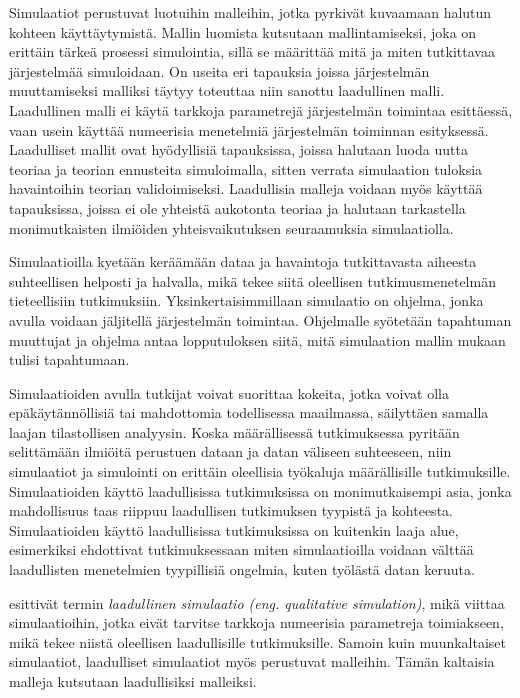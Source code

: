 \documentclass[utf8]{gradu3}
\begin{document}
Simulaatiot perustuvat luotuihin malleihin, 
jotka pyrkivät kuvaamaan halutun kohteen käyttäytymistä. 
Mallin luomista kutsutaan mallintamiseksi, joka on erittäin tärkeä prosessi simulointia,
sillä se määrittää mitä ja miten tutkittavaa järjestelmää simuloidaan. On useita eri tapauksia joissa järjestelmän muuttamiseksi malliksi täytyy toteuttaa niin sanottu laadullinen malli. Laadullinen malli ei käytä tarkkoja parametrejä järjestelmän toimintaa
esittäessä, vaan usein käyttää numeerisia menetelmiä järjestelmän toiminnan esityksessä.
Laadulliset mallit ovat hyödyllisiä tapauksissa, joissa halutaan luoda uutta teoriaa ja teorian ennusteita simuloimalla, sitten verrata simulaation tuloksia havaintoihin teorian validoimiseksi. 
Laadullisia malleja voidaan myös käyttää tapauksissa, joissa ei ole yhteistä aukotonta teoriaa ja halutaan tarkastella monimutkaisten ilmiöiden yhteisvaikutuksen seuraamuksia simulaatiolla.

Simulaatioilla kyetään keräämään dataa ja havaintoja tutkittavasta aiheesta suhteellisen helposti ja halvalla, mikä tekee siitä oleellisen tutkimusmenetelmän tieteellisiin tutkimuksiin. Yksinkertaisimmillaan simulaatio on ohjelma, jonka avulla voidaan jäljitellä järjestelmän toimintaa. Ohjelmalle syötetään tapahtuman muuttujat ja ohjelma antaa lopputuloksen siitä, mitä simulaation mallin mukaan tulisi tapahtumaan. 

Simulaatioiden avulla tutkijat voivat suorittaa kokeita, jotka voivat olla epäkäytännöllisiä tai mahdottomia todellisessa maailmassa, säilyttäen samalla laajan tilastollisen analyysin. Koska määrällisessä tutkimuksessa pyritään selittämään ilmiöitä perustuen dataan ja datan väliseen suhteeseen, niin simulaatiot ja simulointi on erittäin oleellisia työkaluja määrällisille tutkimuksille. 
Simulaatioiden käyttö laadullisissa tutkimuksissa on monimutkaisempi asia, 
jonka mahdollisuus taas riippuu laadullisen tutkimuksen tyypistä ja kohteesta. 
Simulaatioiden käyttö laadullisissa tutkimuksissa on kuitenkin laaja alue, 
esimerkiksi \textcite{eldabi2002quantitative} ehdottivat tutkimuksessaan miten simulaatioilla voidaan välttää laadullisten menetelmien tyypillisiä ongelmia, kuten työlästä datan keruuta. 

\textcite{kuipers1986qualitative} esittivät termin \textit{laadullinen simulaatio (eng. qualitative simulation)}, 
mikä viittaa simulaatioihin, jotka eivät tarvitse tarkkoja numeerisia parametreja toimiakseen, mikä tekee niistä oleellisen laadullisille tutkimuksille. 
Samoin kuin muunkaltaiset simulaatiot, laadulliset simulaatiot myös perustuvat malleihin.
Tämän kaltaisia malleja kutsutaan laadullisiksi malleiksi.
\end{document}
